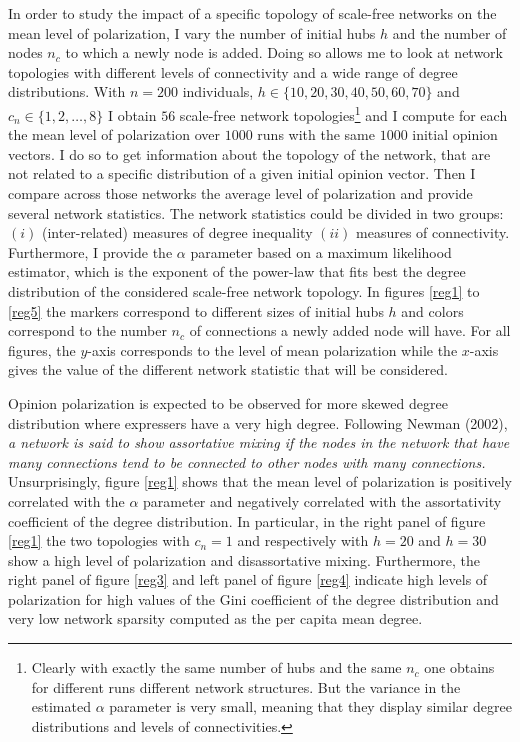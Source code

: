 \documentclass{article}
\begin{document}
In order to study the impact of a specific topology of scale-free networks on the mean level of polarization, I vary the number of initial hubs $h$ and the number of nodes $n_c$ to which a newly node is added.  Doing so allows me to look at network topologies with different levels of connectivity and a wide range of degree distributions. With $n=200$ individuals, $h \in \{ 10,20,30,40,50,60,70\}$ and $c_n \in \{ 1, 2, \ldots , 8\}$ I obtain $56$ scale-free network topologies\footnote{Clearly with exactly the same number of hubs and the same $n_c$ one obtains for different runs different network structures. But the variance in the estimated $\alpha$ parameter is very small, meaning that they display similar degree distributions and levels of connectivities.} and I compute for each the mean level of polarization over $1000$ runs with the same $1000$ initial opinion vectors. I do so to get information about the topology of the network, that are not related to a specific distribution of a given initial opinion vector. Then I compare across those networks the average level of polarization and provide several network statistics. The network statistics could be divided in two groups: $(i)$ (inter-related) measures of degree inequality $(ii)$ measures of connectivity. Furthermore, I provide the $\alpha$ parameter based on a maximum likelihood estimator, which is the exponent of the power-law that fits best the degree distribution of the considered scale-free network topology. In figures \ref{reg1} to \ref{reg5} the markers correspond to different sizes of initial hubs $h$ and colors correspond to the number $n_c$ of connections a newly added node will have. For all figures, the $y$-axis corresponds to the level of mean polarization while the $x$-axis gives the value of the different network statistic that will be considered. 

Opinion polarization is expected to be observed for more skewed degree distribution where expressers have a very high degree. Following Newman (2002)\cite{newman2002}, \textit{a network is said to show assortative mixing if the nodes in the network that have many connections tend to be connected to other nodes with many connections.} Unsurprisingly, figure \ref{reg1} shows that the mean level of polarization is positively correlated with the $\alpha$ parameter and negatively correlated with the assortativity coefficient of the degree distribution. In particular, in the right panel of figure \ref{reg1} the two topologies with $c_n=1$ and respectively with $h=20$ and $h=30$ show a high level of polarization and disassortative mixing. Furthermore, the right panel of figure \ref{reg3} and left panel of figure \ref{reg4} indicate high levels of polarization for high values of the Gini coefficient of the degree distribution and very low network sparsity computed as the per capita mean degree. 
\end{document}
